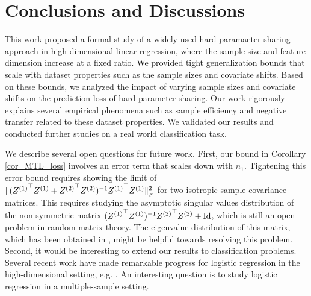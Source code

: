 \section{Conclusions and Discussions}\label{sec_conclude}

This work proposed a formal study of a widely used hard paramaeter sharing approach in high-dimensional linear regression, where the sample size and feature dimension increase at a fixed ratio.
We provided tight generalization bounds that scale with dataset properties such as the sample sizes and covariate shifts.
Based on these bounds, we analyzed the impact of varying sample sizes and covariate shifts on the prediction loss of hard parameter sharing.
Our work rigorously explains several empirical phenomena such as sample efficiency and negative transfer related to these dataset properties.
We validated our results and conducted further studies on a real world classification task.

We describe several open questions for future work.
First, our bound in Corollary \ref{cor_MTL_loss} involves an error term that scales down with $n_1$.
Tightening this error bound requires showing the limit of $\|({Z^{(1)}}^{\top} Z^{(1)} + {Z^{(2)}}^{\top} Z^{(2)})^{-1} {Z^{(1)}}^{\top} Z^{(1)}\|_{_{F}}^2$ for two isotropic sample covariance matrices.
This requires studying the asymptotic singular values distribution of the non-symmetric matrix $({Z^{(1)}}^{\top} Z^{(1)})^{-1}{Z^{(2)}}^{\top} Z^{(2)}+\operatorname{Id}$, which is still an open problem in random matrix theory.  
The eigenvalue distribution of this matrix, which has been obtained in \citet{Fmatrix}, might be helpful towards resolving this problem.
Second, it would be interesting to extend our results to classification problems.
Several recent work have made remarkable progress for logistic regression in the high-dimensional  setting, e.g. \citet{sur2019modern}.
An interesting question is to study logistic regression in a multiple-sample setting.
